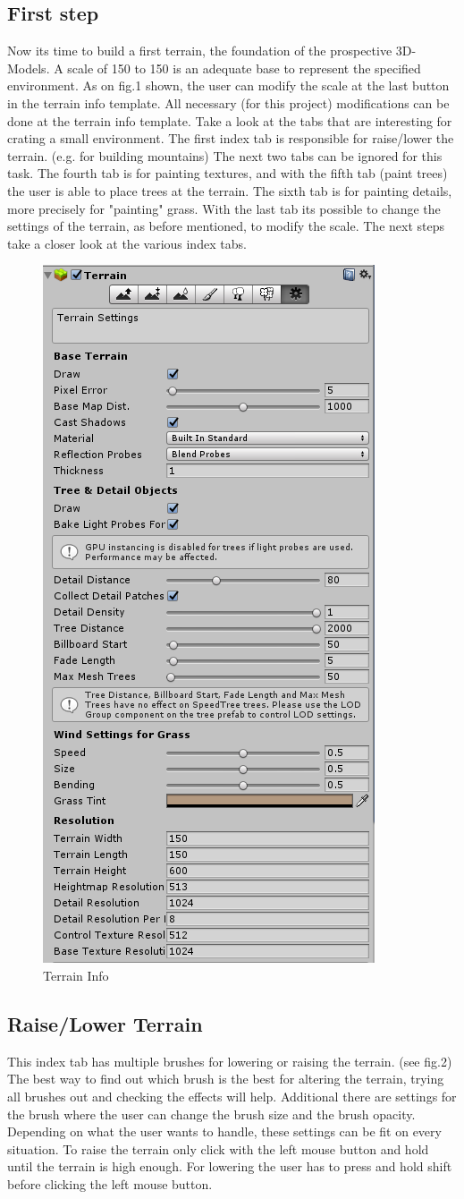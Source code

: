 \documentclass[12pt, a4paper, titlepage]{article}
\begin{document}
\subsection{First step}

Now its time to build a first terrain, the foundation of the prospective 3D-Models. A scale of 150 to 150 is an adequate base to represent the specified environment. As on fig.1 shown, the user can modify the scale at the last button in the terrain info template. All necessary (for this project) modifications can be done at the terrain info template. Take a look at the tabs that are interesting for crating a small environment. The first index tab is responsible for raise/lower the terrain. (e.g. for building mountains) The next two tabs can be ignored for this task. The fourth tab is for painting textures, and with the fifth tab (paint trees) the user is able to place trees at the terrain. The sixth tab is for painting details, more precisely for "painting" grass. With the last tab its possible to change the settings of the terrain, as before mentioned, to modify the scale. The next steps take a closer look at the various index tabs.
\begin{figure}[htbp]
  \centering
  \includegraphics[width=.4\textwidth]{pictures/terrain_info}
  \caption{Terrain Info}
  \label{fig:terrain_info}
\end{figure}

\subsection{Raise/Lower Terrain}
This index tab has multiple brushes for lowering or raising the terrain. (see fig.2) The best way to find out which brush is the
best for altering the terrain, trying all brushes out and checking the effects will help. Additional there are settings for the brush where the user can change the brush size and the brush opacity. Depending on what the user wants to handle, these settings can be fit on every situation. To raise the terrain only click with the left mouse button and hold until the terrain is high enough. For lowering the user has to press and hold shift before clicking the left mouse button.
 
\end{document}
